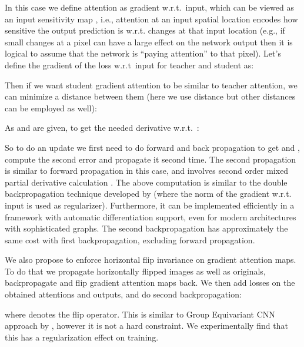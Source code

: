 \documentclass{article} \usepackage{iclr2017_conference}
\begin{document}
In this case we define attention as gradient w.r.t.\ input, which can be viewed as an input sensitivity map \cite{simonyan14}, i.e., attention at an input spatial location  encodes how sensitive the output prediction is w.r.t.  changes at that input location (e.g., if small changes at a pixel can have a large effect on the network output then it is logical to assume that the network is ``paying attention'' to that pixel).   Let's define the gradient of the loss w.r.t\ input for teacher and student as:

\vspace{-0.2cm}


Then if we want student gradient attention to be similar to teacher attention, we can minimize a distance between them (here we  use  distance but other distances can be employed as well):

\vspace{-0.2cm}


As  and  are given, to get the needed derivative w.r.t.\ :

\vspace{-0.2cm}


So to do an update we first need to do forward and back propagation to get  and , compute the second error  and propagate it second time. The second propagation is similar to forward propagation in this case, and involves second order mixed partial derivative calculation . The above computation is similar to the double backpropagation technique developed by \cite{drucker-lecun-92} (where the  norm of the gradient w.r.t.  input is used as  regularizer). Furthermore, it can be implemented efficiently in a framework with automatic differentiation support, even for modern architectures with sophisticated graphs. The second backpropagation has approximately  the same cost with first backpropagation, excluding forward propagation. 

We also propose to enforce horizontal flip invariance on gradient attention maps. To do that we propagate horizontally flipped images as well as originals, backpropagate and flip gradient attention maps back. We then add  losses on the obtained attentions and outputs, and do second backpropagation:

\vspace{-0.4cm}


where  denotes the flip operator. This is similar to Group Equivariant CNN approach by \cite{DBLP:journals/corr/CohenW16}, however it is not a hard constraint. We experimentally find that this has a regularization effect on training.
\end{document}

